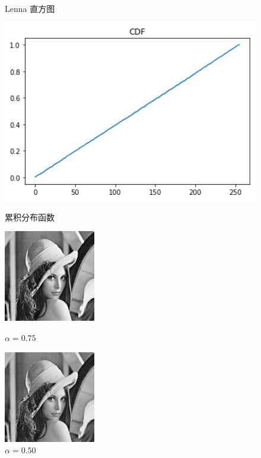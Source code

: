 \documentclass[a4paper,UTF8]{article}
\numberwithin{equation}{section}
\begin{document}
\begin{enumerate}[(\romannumeral1)]
\begin{figure}[htbp]
\begin{minipage}[t]{0.3\textwidth}
\caption{Lenna 直方图}
\label{Lenna:Pcount}
\end{minipage}
\begin{minipage}[t]{0.3\textwidth}
\centering
\includegraphics[width=1.0\textwidth]{Lenna_processed_cdf.png}
\caption{累积分布函数}
\label{Lenna:Pcdf}
\end{minipage}
\begin{minipage}[t]{0.3\textwidth}
\centering
\includegraphics[width=4cm]{Lenna_processed_75.jpg}
\caption{ $\alpha=0.75$}
\label{Lenna:75p}
\end{minipage}
\begin{minipage}[t]{0.3\textwidth}
\centering
\includegraphics[width=4cm]{Lenna_processed_50.jpg}
\caption{  $\alpha=0.50$}
\label{Lenna:50p}
\end{minipage}
\begin{minipage}[t]{0.3\textwidth}

\end{minipage}
\end{figure}
\end{enumerate}
\end{document}
